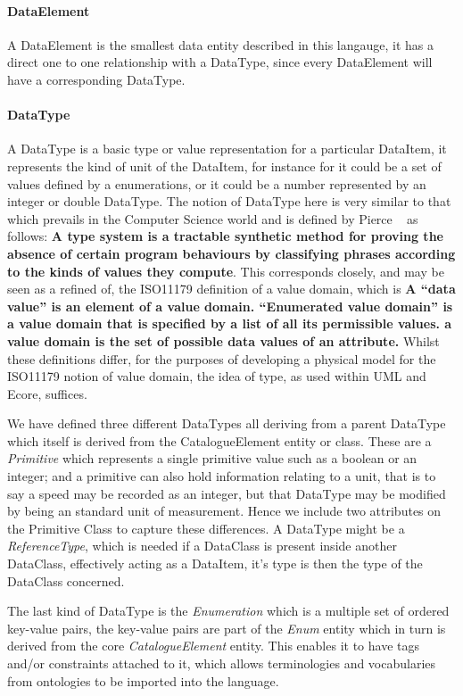 \documentclass{llncs}
\begin{document}
	\paragraph{DataElement}
	A DataElement is the smallest data entity described in this langauge, it has a direct one to one relationship with a DataType, since every DataElement will have a corresponding DataType. 
	
	\paragraph{DataType}
	A DataType is a basic type or value representation for a particular DataItem, it represents the kind of unit of the DataItem, for instance for it could be a set of values defined by a enumerations, or it could be a number represented by an integer or double DataType. The notion of DataType here is very similar to that which prevails in the Computer Science world and is defined by Pierce  ~\cite{Pierce} as follows:
	\textbf{A type system is a tractable synthetic method for proving the absence of certain program behaviours by classifying phrases according to the kinds of values they compute}. This corresponds closely, and may be seen as a refined of, the ISO11179 definition of a value domain, which is \textbf{A “data value” is an element of a value domain. “Enumerated value domain” is a value domain that is specified by a list of all its permissible values. a value domain is the set of possible data values of an attribute. } Whilst these definitions differ, for the purposes of developing a physical model for the ISO11179 notion of value domain, the idea of type, as used within UML and Ecore, suffices.
	
	We have defined three different DataTypes all deriving from a parent DataType which itself is derived from the CatalogueElement entity or class. These are a \emph{Primitive} which represents a single primitive value such as a boolean or an integer; and a primitive can also hold information relating to a unit, that is to say a speed may be recorded as an integer, but that DataType may be modified by being an standard unit of measurement. Hence we include two attributes on the Primitive Class to capture these differences. A DataType might be a \emph{ReferenceType}, which is needed if a DataClass is present inside another DataClass, effectively acting as a DataItem, it's type is then the type of the DataClass concerned. 
	
	The last kind of DataType is the \emph{Enumeration} which is a multiple set of ordered key-value pairs, the key-value pairs are part of the \emph{Enum} entity which in turn is derived from the core \emph{CatalogueElement} entity. This enables it to have tags and/or constraints attached to it, which allows terminologies and vocabularies from ontologies to be imported into the language.
	
\end{document}
